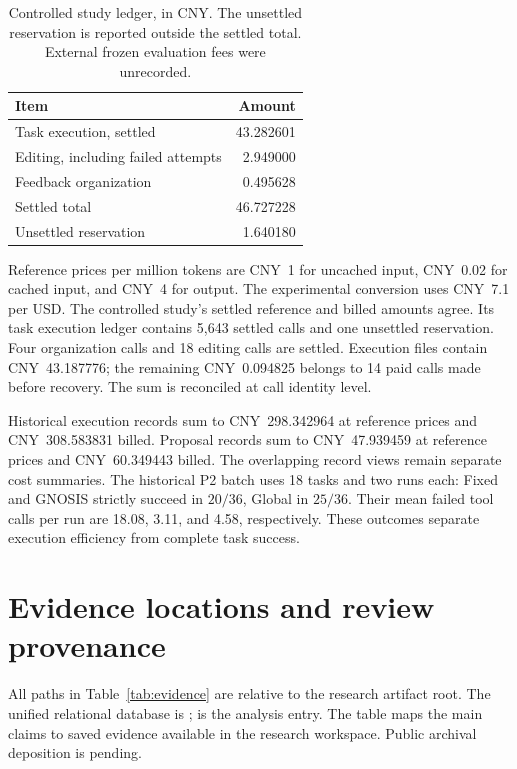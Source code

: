 \documentclass{ecai}
\begin{document}
\begin{table}[t]
\centering
\caption{Controlled study ledger, in CNY. The unsettled reservation is reported outside the settled total. External frozen evaluation fees were unrecorded.}
\label{tab:ledger}
\small
\renewcommand{\arraystretch}{1.13}
\begin{tabular*}{\columnwidth}{@{\extracolsep{\fill}}lr@{}}
\toprule
Item & Amount\\
\midrule
Task execution, settled & 43.282601\\
Editing, including failed attempts & 2.949000\\
Feedback organization & 0.495628\\
\midrule
Settled total & 46.727228\\
\addlinespace
Unsettled reservation & 1.640180\\
\bottomrule
\end{tabular*}
\end{table}

Reference prices per million tokens are CNY~1 for uncached input, CNY~0.02 for cached input, and CNY~4 for output. The experimental conversion uses CNY~7.1 per USD. The controlled study's settled reference and billed amounts agree. Its task execution ledger contains 5,643 settled calls and one unsettled reservation. Four organization calls and 18 editing calls are settled. Execution files contain CNY~43.187776; the remaining CNY~0.094825 belongs to 14 paid calls made before recovery. The sum is reconciled at call identity level.

Historical execution records sum to CNY~298.342964 at reference prices and CNY~308.583831 billed. Proposal records sum to CNY~47.939459 at reference prices and CNY~60.349443 billed. The overlapping record views remain separate cost summaries. The historical P2 batch uses 18 tasks and two runs each: Fixed and GNOSIS strictly succeed in $20/36$, Global in $25/36$. Their mean failed tool calls per run are 18.08, 3.11, and 4.58, respectively. These outcomes separate execution efficiency from complete task success.

\section{Evidence locations and review provenance}

All paths in Table~\ref{tab:evidence} are relative to the research artifact root. The unified relational database is ;  is the analysis entry. The table maps the main claims to saved evidence available in the research workspace. Public archival deposition is pending.
\end{document}
